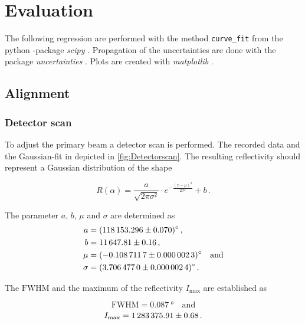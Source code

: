 \section{Evaluation}
\label{sec:auswertung}

%
The following regression are performed with the method \texttt{curve\_fit} from the python \cite{py}-package \textit{scipy} \cite{scipy}.
Propagation of the uncertainties are done with the package \textit{uncertainties} \cite{uncertainties}.
Plots are created with \textit{matplotlib} \cite{matplotlib}.

\subsection{Alignment}

\subsubsection{Detector scan}

To adjust the primary beam a detector scan is performed.
The recorded data and the Gaussian-fit in depicted in \autoref{fig:Detectorscan}.
The resulting reflectivity should represent a Gaussian distribution of the shape

\begin{equation*}
    R\left(\alpha\right) = \frac{a}{\sqrt{2\pi\sigma²}} \cdot e^{-\frac{\left(x -\mu\right)^2}{2\sigma^2}} + b \,.
\end{equation*}

The parameter $a$, $b$, $\mu$ and $\sigma$ are determined as 
\begin{align*}
    a &=  \SI{118153.296 \pm 0.070}{\degree}\,, \\
    b & = \num{11647.81 \pm 0.16}\,, \\
    \mu    &= \SI{ -0.1087117 \pm   0.0000023}{\degree}\quad \text{and} \\
    \sigma &= \SI{  3.706477 \pm  0.0000024}{\degree}\,. \\
\end{align*}

The $\text{FWHM}$ and the maximum of the reflectivity $I_\text{max}$ are established as 

\begin{equation*}
    \text{FWHM} = \SI{0.087}{\degree} \quad \text{and}
\end{equation*}
\begin{equation*}
    I_{\text{max}} = \num{1283375.91 \pm 0.68}\,.
\end{equation*}


